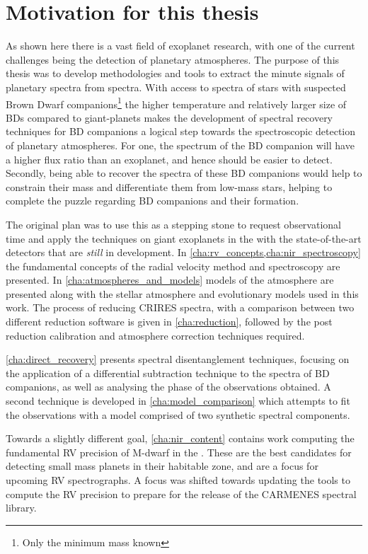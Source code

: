 \section{Motivation for this thesis}
\label{sec:thesis_motivation}

As shown here there is a vast field of exoplanet research, with one of the current challenges being the detection of planetary atmospheres.
The purpose of this thesis was to develop methodologies and tools to extract the minute signals of planetary spectra from \nir{} spectra.
With access to \nir{} spectra of stars with suspected Brown Dwarf companions\footnote{Only the minimum mass \Mtwosini{} known} the higher temperature and relatively larger size of BDs compared to giant-planets makes the development of spectral recovery techniques for {BD} companions a logical step towards the spectroscopic detection of planetary atmospheres.
For one, the spectrum of the {BD} companion will have a higher flux ratio than an exoplanet, and hence should be easier to detect.
Secondly, being able to recover the spectra of these {BD} companions would help to constrain their mass and differentiate them from low-mass stars, helping to complete the puzzle regarding {BD} companions and their formation.

The original plan was to use this as a stepping stone to request observational time and apply the techniques on giant exoplanets in the \nir{} with the state-of-the-art detectors that are \emph{still} in development.
In \cref{cha:rv_concepts,cha:nir_spectroscopy} the fundamental concepts of the radial velocity method and \nir{} spectroscopy are presented.
In \cref{cha:atmospheres_and_models} models of the atmosphere are presented along with the stellar atmosphere and evolutionary models used in this work.
The process of reducing \nir{} {CRIRES} spectra, with a comparison between two different reduction software is given in \cref{cha:reduction}, followed by the post reduction calibration and atmosphere correction techniques required.

\cref{cha:direct_recovery} presents spectral disentanglement techniques, focusing on the application of a differential subtraction technique to the \nir{} spectra of {BD} companions, as well as analysing the phase of the observations obtained.
A second technique is developed in \cref{cha:model_comparison} which attempts to fit the observations with a model comprised of two synthetic spectral components.

Towards a slightly different goal, \cref{cha:nir_content} contains work computing the fundamental {RV} precision of {M-dwarf} in the \nir{}.
These are the best candidates for detecting small mass planets in their habitable zone, and are a focus for upcoming \nir{} {RV} spectrographs.
A focus was shifted towards updating the tools to compute the {RV} precision to prepare for the release of the {CARMENES} \nir{} spectral library.
